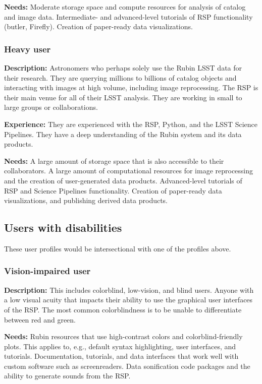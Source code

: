 \textbf{Needs:}
Moderate storage space and compute resources for analysis of catalog and image data.
Intermediate- and advanced-level tutorials of RSP functionality (butler, Firefly).
Creation of paper-ready data visualizations.

\subsubsection{Heavy user}

\textbf{Description:} 
Astronomers who perhaps solely use the Rubin LSST data for their research.
They are querying millions to billions of catalog objects and interacting
with images at high volume, including image reprocessing.
The RSP is their main venue for all of their LSST analysis.
They are working in small to large groups or collaborations.

\textbf{Experience:} 
They are experienced with the RSP, Python, and the LSST Science Pipelines.
They have a deep understanding of the Rubin system and its data products.

\textbf{Needs:}
A large amount of storage space that is also accessible to their collaborators.
A large amount of computational resources for image reprocessing and the
creation of user-generated data products.
Advanced-level tutorials of RSP and Science Pipelines functionality.
Creation of paper-ready data visualizations, and publishing derived data products.

\subsection{Users with disabilities}

These user profiles would be intersectional with one of the profiles above.

\subsubsection{Vision-impaired user}

\textbf{Description:}
This includes colorblind, low-vision, and blind users.
Anyone with a low visual acuity that impacts their ability to use the 
graphical user interfaces of the RSP.
The most common colorblindness is to be unable to differentiate between red and green.

\textbf{Needs:}
Rubin resources that use high-contrast colors and colorblind-friendly plots.
This applies to, e.g., default syntax highlighting, user interfaces, and tutorials.
Documentation, tutorials, and data interfaces that work well with custom software such
as screenreaders.
Data sonification code packages and the ability to generate sounds from the RSP.

